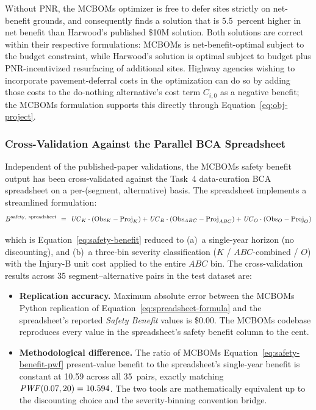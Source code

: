 Without PNR, the MCBOMs optimizer is free to defer sites strictly on
net-benefit grounds, and consequently finds a solution that is 5.5~percent
higher in net benefit than Harwood's published \$10M solution.
Both solutions are correct within their respective formulations: MCBOMs is
net-benefit-optimal subject to the budget constraint, while Harwood's
solution is optimal subject to budget plus PNR-incentivized resurfacing of
additional sites. Highway agencies wishing to incorporate pavement-deferral
costs in the optimization can do so by adding those costs to the
do-nothing alternative's cost term $C_{i,0}$ as a negative benefit; the
MCBOMs formulation supports this directly through
Equation~\ref{eq:obj-project}.

\subsubsection{Cross-Validation Against the Parallel BCA Spreadsheet}

Independent of the published-paper validations, the MCBOMs safety benefit
output has been cross-validated against the Task~4 data-curation BCA
spreadsheet on a per-(segment, alternative) basis. The spreadsheet
implements a streamlined formulation:
\begin{equation}
B^{\mathrm{safety,\ spreadsheet}}\ =\ \mathit{UC}_K \cdot (\mathrm{Obs}_K - \mathrm{Proj}_K)
  + \mathit{UC}_B \cdot (\mathrm{Obs}_{ABC} - \mathrm{Proj}_{ABC})
  + \mathit{UC}_O \cdot (\mathrm{Obs}_O - \mathrm{Proj}_O)
\label{eq:spreadsheet-formula}
\end{equation}

\noindent which is Equation~\ref{eq:safety-benefit} reduced to (a)~a
single-year horizon (no discounting), and (b)~a three-bin severity
classification ($K$ / $ABC$-combined / $O$) with the Injury-B unit cost
applied to the entire $ABC$ bin. The cross-validation results across 35
segment--alternative pairs in the test dataset are:

\begin{itemize}[leftmargin=2em, itemsep=2pt]
  \item \textbf{Replication accuracy.} Maximum absolute error between the
    MCBOMs Python replication of Equation~\ref{eq:spreadsheet-formula} and
    the spreadsheet's reported \emph{Safety Benefit} values is \$0.00. The
    MCBOMs codebase reproduces every value in the spreadsheet's safety
    benefit column to the cent.
  \item \textbf{Methodological difference.} The ratio of MCBOMs
    Equation~\ref{eq:safety-benefit-pwf} present-value benefit to the
    spreadsheet's single-year benefit is constant at 10.59 across all
    35~pairs, exactly matching $\mathit{PWF}(0.07, 20) = 10.594$. The two tools
    are mathematically equivalent up to the discounting choice and the
    severity-binning convention bridge.
\end{itemize}

